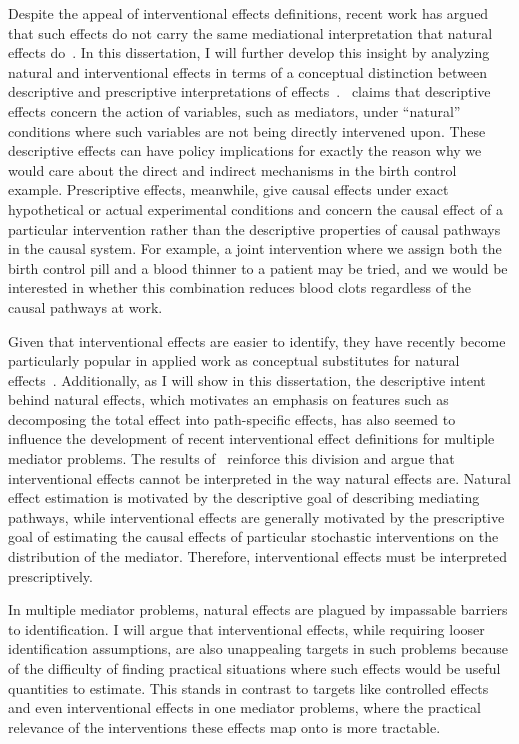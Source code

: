Despite the appeal of interventional effects definitions, recent work has argued that such effects do 
not carry the same mediational interpretation that natural effects do~\citep{miles2023}. In this 
dissertation, I will further develop this insight by analyzing natural and interventional 
effects in terms of a conceptual distinction between descriptive and prescriptive interpretations of 
effects~\citep{pearl2001}.~\cite{pearl2001} claims that descriptive effects concern the action of
variables, such as mediators, under ``natural'' conditions where such variables are not being directly
intervened upon. These descriptive effects can have policy implications for exactly the reason why 
we would care about the direct and indirect mechanisms in the birth control example. Prescriptive 
effects, meanwhile, give causal effects under exact hypothetical or actual experimental conditions
and concern the causal effect of a particular intervention rather than the descriptive properties
of causal pathways in the causal system. For example, a joint intervention where we assign both
the birth control pill and a blood thinner to a patient may be tried, and we would be interested in
whether this combination reduces blood clots regardless of the causal pathways at work.

Given that interventional effects are easier to identify, they have recently
become particularly popular in applied work as conceptual substitutes for natural
effects~\citep{miles2023}. Additionally, as I will show in this dissertation, the descriptive
intent behind natural effects, which motivates an emphasis on features such as decomposing the total
effect into path-specific effects, has also seemed to influence the development of recent
interventional effect definitions for multiple mediator problems. The results
of~\cite{miles2023} reinforce this division and argue that interventional effects cannot be 
interpreted in the way natural effects are. Natural effect estimation is motivated by the 
descriptive goal of describing mediating pathways, while interventional effects are generally 
motivated by the prescriptive goal of estimating the causal 
effects of particular stochastic interventions on the distribution of the mediator. Therefore,
interventional effects must be interpreted prescriptively. 

In multiple mediator problems, natural effects are plagued by impassable barriers to identification. 
I will argue that interventional effects, while requiring looser identification assumptions, 
are also unappealing targets in such problems because of the difficulty of finding practical 
situations where such effects would be useful quantities to estimate. This stands in contrast to 
targets like controlled effects and even interventional effects in one mediator problems, where the 
practical relevance of the interventions these effects map onto is more tractable. 

